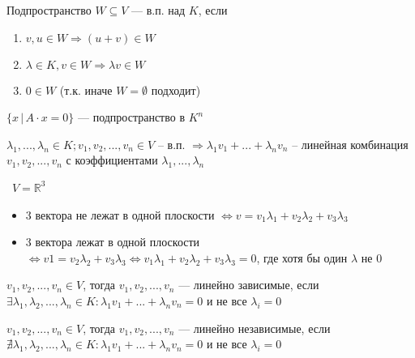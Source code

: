 \newpage
\begin{definition}
    Подпространство $W \subseteq V$ --- в.п. над $K$, если
    \begin{enumerate}
        \item $v, u \in W \Longrightarrow (u + v) \in W$
        \item $\lambda \in K, v \in W \Longrightarrow \lambda v \in W$
        \item $0 \in W$ (т.к. иначе $W = \emptyset$ подходит)
    \end{enumerate}
\end{definition}

\quad

\begin{example}
    $\{ x \,| \, A \cdot x = 0 \} $ --- подпространство в $K ^ n$
\end{example}



\begin{definition}
    $\lambda_1, ..., \lambda_n \in K; v_1, v_2, ..., v_n \in V $ -- в.п. $\Longrightarrow \lambda_1 v_1 + ... + \lambda_n v_n$ -- линейная комбинация $v_1, v_2, ..., v_n$ с коэффициентами $\lambda_1, ..., \lambda_n$ 
\end{definition}

\begin{motivation} 

    \quad\, $V = \mathbb{R} ^ 3$
    \begin{itemize}
        \item 3 вектора не лежат в одной плоскости $\Longleftrightarrow v = v_1\lambda_1 + v_2\lambda_2 + v_3\lambda_3$ 
        \item 3 вектора лежат в одной плоскости $\Longleftrightarrow v1 = v_2\lambda_2 + v_3\lambda_3 \Longleftrightarrow v_1\lambda_1 + v_2\lambda_2 + v_3\lambda_3 = 0$, где хотя бы один $\lambda$ не 0 
    \end{itemize} 
    
\end{motivation}


\begin{definition}
    $v_1, v_2, ..., v_n \in V$, тогда $v_1, v_2, ..., v_n$ --- линейно зависимые, если \\ $\exists \lambda_1, \lambda_2, ..., \lambda_n \in K : \lambda_1 v_1 + ... + \lambda_n v_n = 0$ и не все $\lambda_i = 0$
\end{definition}

\begin{definition}
    $v_1, v_2, ..., v_n \in V$, тогда $v_1, v_2, ..., v_n$ --- линейно независимые, если \\ $\nexists \lambda_1, \lambda_2, ..., \lambda_n \in K : \lambda_1 v_1 + ... + \lambda_n v_n = 0$ и не все $\lambda_i = 0$
\end{definition}
